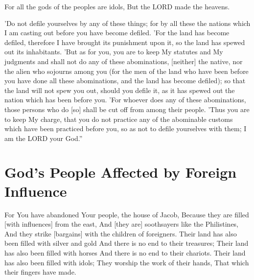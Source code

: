 \vspace{2\baselineskip}

\begin{scripture}[Psalm 96:5]
    For all the gods of the peoples are idols, But the LORD made the heavens.
\end{scripture}

\vspace{2\baselineskip}

\begin{scripture}[Leviticus 18:24-30]
    'Do not defile yourselves by any of these things; for by all these the nations which I am casting out before you have become defiled.
    'For the land has become defiled, therefore I have brought its punishment upon it, so the land has spewed out its inhabitants.
    'But as for you, you are to keep My statutes and My judgments and shall not do any of these abominations, [neither] the native, nor the alien who sojourns among you
    (for the men of the land who have been before you have done all these abominations, and the land has become defiled);
    so that the land will not spew you out, should you defile it, as it has spewed out the nation which has been before you.
    'For whoever does any of these abominations, those persons who do [so] shall be cut off from among their people.
    'Thus you are to keep My charge, that you do not practice any of the abominable customs which have been practiced before you, so as not to defile yourselves with them; I am the LORD your God.''
\end{scripture}

\section{God's People Affected by Foreign Influence}

\begin{scripture}[Isaiah 2:6-8]
    For You have abandoned Your people, the house of Jacob, Because they are filled [with influences] from the east, And [they are] soothsayers like the Philistines, And they strike [bargains] with the children of foreigners.
    Their land has also been filled with silver and gold And there is no end to their treasures; Their land has also been filled with horses And there is no end to their chariots.
    Their land has also been filled with idols; They worship the work of their hands, That which their fingers have made.
\end{scripture}

